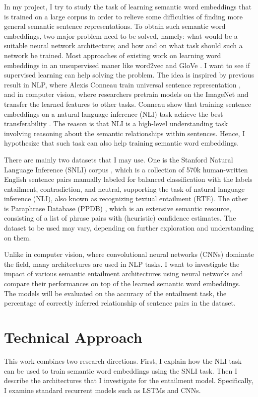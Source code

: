 \documentclass[10pt,twocolumn,letterpaper]{article}
\begin{document}
In my project, I try to study the task of learning semantic word embeddings that is trained on a large corpus in order to relieve some difficulties of finding more general semantic sentence representations. To obtain such semantic word embeddings, two major problem need to be solved, namely: what would be a suitable neural network architecture; and how and on what task should such a network be trained. Most approaches of existing work on learning word embeddings in an unsupervised maner like word2vec \cite{mikolov2013distributed} and GloVe \cite{pennington2014glove}. I want to see if supervised learning can help solving the problem. The idea is inspired by previous result in NLP, where Alexis Conneau \etal train universal sentence representation \cite{conneau2017supervised}, and in computer vision, where researchers pretrain models on the ImageNet \cite{deng2009imagenet} and transfer the learned features to other tasks. Conneau \etal show that training sentence embeddings on a natural language inference (NLI) task achieve the best transferability \cite{conneau2017supervised}. The reason is that NLI is a high-level understanding task involving reasoning about the semantic relationships within sentences. Hence, I hypothesize that such task can also help training semantic word embeddings.

There are mainly two datasets that I may use. One is the Stanford Natural Language Inference (SNLI) corpus \cite{bowman2015large}, which is a collection of 570k human-written English sentence pairs manually labeled for balanced classification with the labels entailment, contradiction, and neutral, supporting the task of natural language inference (NLI), also known as recognizing textual entailment (RTE). The other is Paraphrase Database (PPDB) \cite{ganitkevitch2013ppdb}, which is an extensive semantic resource, consisting of a list of phrase pairs with (heuristic) confidence estimates. The dataset to be used may vary, depending on further exploration and understanding on them.

Unlike in computer vision, where convolutional neural networks (CNNs) dominate the field, many architectures are used in NLP tasks. I want to investigate the impact of various semantic entailment architectures using neural networks and compare their performances on top of the learned semantic word embeddings. The models will be evaluated on the accuracy of the entailment task, \ie the percentage of correctly inferred relationship of sentence pairs in the dataset.

\section{Technical Approach}
This work combines two research directions. First, I explain how the NLI task can be used to train semantic word embeddings using the SNLI task. Then I describe the architectures that I investigate for the entailment model. Specifically, I examine standard recurrent models such as LSTMs \cite{hochreiter1997long} and CNNs.
\end{document}
